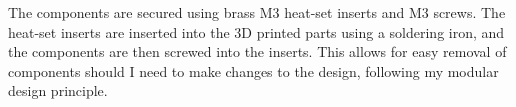 The components are secured using brass M3 heat-set inserts and M3 screws. The heat-set inserts are inserted into the 3D printed parts using a soldering iron,
and the components are then screwed into the inserts. This allows for easy removal of components should I need to make changes to the design, following
my modular design principle.
